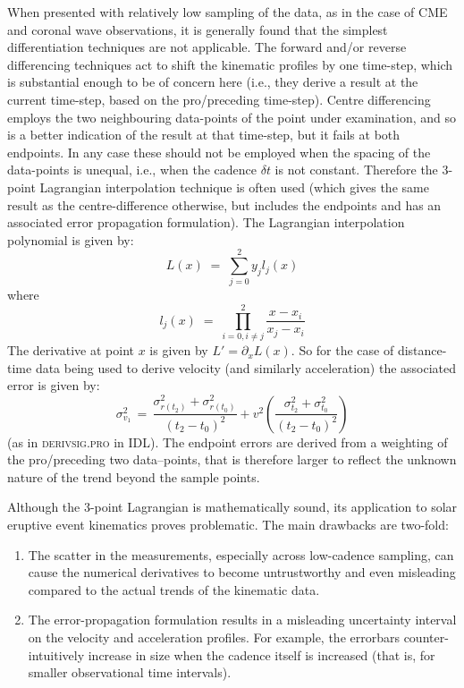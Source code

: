\documentclass[structabstract]{aa}
\begin{document}
When presented with relatively low sampling of the data, as in the case of CME and coronal wave observations, it is generally found that the simplest differentiation techniques are not applicable. The forward and/or reverse differencing techniques act to shift the kinematic profiles by one time-step, which is substantial enough to be of concern here (i.e., they derive a result at the current time-step, based on the pro/preceding time-step). Centre differencing employs the two neighbouring data-points of the point under examination, and so is a better indication of the result at that time-step, but it fails at both endpoints. In any case these should not be employed when the spacing of the data-points is unequal, i.e., when the cadence $\delta t$ is not constant. Therefore the 3-point Lagrangian interpolation technique is often used (which gives the same result as the centre-difference otherwise, but includes the endpoints and has an associated error propagation formulation). The Lagrangian interpolation polynomial is given by:
\begin{equation}
L(x) \; =\; \sum_{j=0}^2 y_j l_j(x) 
\end{equation}
where
\begin{equation}
l_j(x) \; =\; \prod_{i=0, i\neq j}^2 \frac{x-x_i}{x_j-x_i} 
\end{equation}
The derivative at point $x$ is given by $L'=\partial_x L(x)$. So for the case of distance-time data being used to derive velocity (and similarly acceleration) the associated error is given by:
\begin{equation}
\sigma_{v_1}^2 \,=\, \frac{\sigma_{r(t_2)}^2+\sigma_{r(t_0)}^2}{(t_2-t_0)^2} + v^2 \left( \frac{\sigma_{t_2}^2+\sigma_{t_0}^2}{(t_2-t_0)^2} \right)
\label{vel_err}
\end{equation}
(as in \textsc{derivsig.pro} in IDL). The endpoint errors are derived from a weighting of the pro/preceding two data--points, that is therefore larger to reflect the unknown nature of the trend beyond the sample points.

Although the 3-point Lagrangian is mathematically sound, its application to solar eruptive event kinematics proves problematic. The main drawbacks are two-fold:
\begin{enumerate}
\item The scatter in the measurements, especially across low-cadence sampling, can cause the numerical derivatives to become untrustworthy and even misleading compared to the actual trends of the kinematic data.
\item The error-propagation formulation results in a misleading uncertainty interval on the velocity and acceleration profiles. For example, the errorbars counter-intuitively increase in size when the cadence itself is increased (that is, for smaller observational time intervals).
\end{enumerate}
\end{document}
